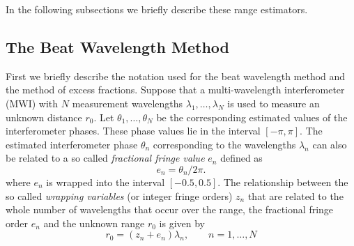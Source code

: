 In the following subsections we briefly describe these range estimators. 
\subsection{The Beat Wavelength Method}
First we briefly describe the notation used for the beat wavelength method and the method of excess fractions. Suppose that a multi-wavelength interferometer (MWI) with $N$  measurement wavelengths $\lambda_1, \ldots, \lambda_N$ is used to measure an unknown distance $r_0$. Let $\theta_1,\ldots,\theta_N$ be the corresponding estimated values of the interferometer phases. These phase values lie in the interval $[-\pi, \pi]$. The estimated interferometer phase $\theta_n$ corresponding to the wavelengths $\lambda_n$ can also be related to a so called \emph{fractional fringe value} $e_n$ defined as~\cite{Falaggis-generalized-th-of-PU-2012}
\[
e_n = \theta_n/2\pi.
\]
where $e_n$ is wrapped into the interval $[-0.5, 0.5]$. The relationship between the so called \emph{wrapping variables} (or integer fringe orders) $z_n$ that are related to the whole number of wavelengths that occur over the range, the fractional fringe order $e_n$ and the unknown range $r_0$ is given by
\begin{equation}\label{eq:r0-zn-yn}
r_0 = (z_n + e_n)\lambda_n, \qquad n=1,\ldots,N
\end{equation}

